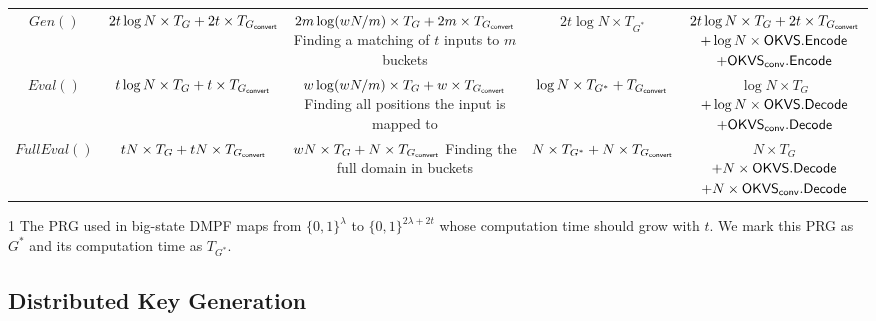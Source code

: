 \begin{table*}
{\begin{threeparttable}
\begin{tabular}{ccccc}
        \cline{1-5}
				
				$Gen()$ & $2t\log N\times T_G+2t\times T_{G_{\sf convert}}$ &\makecell{$2m\log(wN/m)\times T_G+2m\times T_{G_{\sf convert}}$\\Finding a matching of $t$ inputs to $m$ buckets} &$2t\log N\times T_{G^*}$\tnote{1}
        & \makecell{$2t\log N\times T_G+2t\times T_{G_{\sf convert}}$\\$+\log N\times {\sf OKVS}.{\sf Encode}$\\$+ \OKVS_{\sf conv}.\Encode$} \\

        \cline{1-5}

				$Eval()$ & $t\log N\times T_G+t\times T_{G_{\sf convert}}$ &\makecell{$w\log(wN/m)\times T_G + w\times T_{G_{\sf convert}}$\\Finding all positions the input is mapped to} & $\log N\times T_{G^*} + T_{G_{\sf convert}}$ &\makecell{$\log N\times T_G$ \\$+\log N\times{\sf OKVS}.{\sf Decode}$\\ $+\OKVS_{\sf conv}.\Decode$} \\

        \cline{1-5}

				$FullEval()$ & $tN\times T_G+tN\times T_{G_{\sf convert}}$ &\makecell{$wN\times T_G+ N\times T_{G_{\sf convert}}$\\Finding the full domain in buckets} & $N\times T_{G^*} + N\times T_{G_{\sf convert}}$ & \makecell{$N\times T_G$ \\ $+N\times{\sf OKVS}.{\sf Decode}$\\$+N\times {\sf OKVS}_{\sf conv}.{\sf Decode}$} \\
        \bottomrule
			\end{tabular}	
      \begin{tablenotes}
        \item [1] The PRG used in big-state DMPF maps from $\{0,1\}^\lambda$ to $\{0,1\}^{2\lambda+2t}$ whose computation time should grow with $t$. We mark this PRG as $G^*$ and its computation time as $T_{G^*}$. 
        \end{tablenotes}
    \end{threeparttable}
    }
	\end{table*}


  
\subsection{Distributed Key Generation}